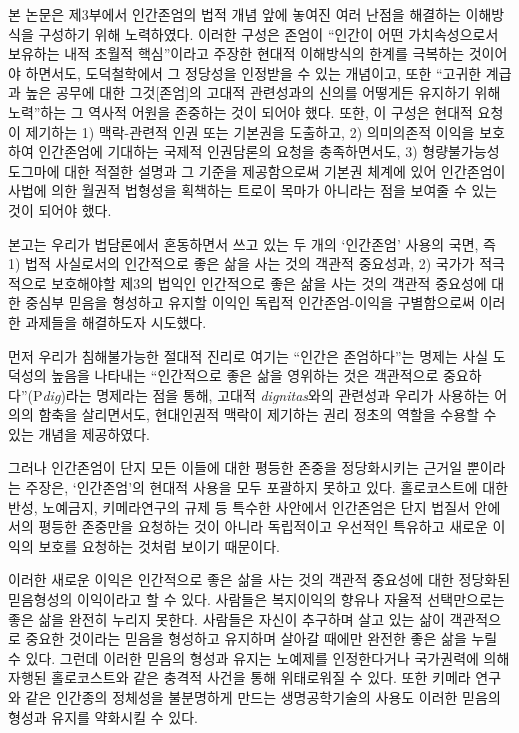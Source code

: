 본 논문은 제3부에서 인간존엄의 법적 개념 앞에 놓여진 여러 난점을 해결하는 이해방식을 구성하기 위해 노력하였다. 이러한 구성은 존엄이 ``인간이 어떤 가치속성으로서 보유하는 내적 초월적 핵심''이라고 주장한 현대적 이해방식의 한계를 극복하는 것이어야 하면서도, 도덕철학에서 그 정당성을 인정받을 수 있는 개념이고, 또한 ``고귀한 계급과 높은 공무에 대한 그것{[}존엄{]}의 고대적 관련성과의 신의를 어떻게든 유지하기 위해 노력''하는 그 역사적 어원을 존중하는 것이 되어야 했다. 또한, 이 구성은 현대적 요청이 제기하는 1) 맥락-관련적 인권 또는 기본권을 도출하고, 2) 의미의존적 이익을 보호하여 인간존엄에 기대하는 국제적 인권담론의 요청을 충족하면서도, 3) 형량불가능성 도그마에 대한 적절한 설명과 그 기준을 제공함으로써 기본권 체계에 있어 인간존엄이 사법에 의한 월권적 법형성을 획책하는 트로이 목마가 아니라는 점을 보여줄 수 있는 것이 되어야 했다.

본고는 우리가 법담론에서 혼동하면서 쓰고 있는 두 개의 `인간존엄' 사용의 국면, 즉 1) 법적 사실로서의 인간적으로 좋은 삶을 사는 것의 객관적 중요성과, 2) 국가가 적극적으로 보호해야할 제3의 법익인 인간적으로 좋은 삶을 사는 것의 객관적 중요성에 대한 중심부 믿음을 형성하고 유지할 이익인 독립적 인간존엄-이익을 구별함으로써 이러한 과제들을 해결하도자 시도했다.

먼저 우리가 침해불가능한 절대적 진리로 여기는 ``인간은 존엄하다''는 명제는 사실 도덕성의 높음을 나타내는 ``인간적으로 좋은 삶을 영위하는 것은 객관적으로 중요하다''(P\emph{dig})라는 명제라는 점을 통해, 고대적 \emph{dignitas}와의 관련성과 우리가 사용하는 어의의 함축을 살리면서도, 현대인권적 맥락이 제기하는 권리 정초의 역할을 수용할 수 있는 개념을 제공하였다.

그러나 인간존엄이 단지 모든 이들에 대한 평등한 존중을 정당화시키는 근거일 뿐이라는 주장은, `인간존엄'의 현대적 사용을 모두 포괄하지 못하고 있다. 홀로코스트에 대한 반성, 노예금지, 키메라연구의 규제 등 특수한 사안에서 인간존엄은 단지 법질서 안에서의 평등한 존중만을 요청하는 것이 아니라 독립적이고 우선적인 특유하고 새로운 이익의 보호를 요청하는 것처럼 보이기 때문이다.

이러한 새로운 이익은 인간적으로 좋은 삶을 사는 것의 객관적 중요성에 대한 정당화된 믿음형성의 이익이라고 할 수 있다. 사람들은 복지이익의 향유나 자율적 선택만으로는 좋은 삶을 완전히 누리지 못한다. 사람들은 자신이 추구하며 살고 있는 삶이 객관적으로 중요한 것이라는 믿음을 형성하고 유지하며 살아갈 때에만 완전한 좋은 삶을 누릴 수 있다. 그런데 이러한 믿음의 형성과 유지는 노예제를 인정한다거나 국가권력에 의해 자행된 홀로코스트와 같은 충격적 사건을 통해 위태로워질 수 있다. 또한 키메라 연구와 같은 인간종의 정체성을 불분명하게 만드는 생명공학기술의 사용도 이러한 믿음의 형성과 유지를 약화시킬 수 있다.

